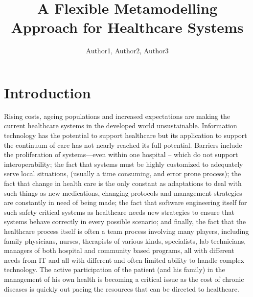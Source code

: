 \documentclass[a4paper]{llncs}
\begin{document}

\title{A Flexible Metamodelling Approach for Healthcare Systems} %


\author{Author1, Author2, Author3 }

\maketitle

\begin{abstract}


\end{abstract}


\section{Introduction}

Rising costs, ageing populations and increased expectations are making the current healthcare systems in the developed world unsustainable.  
Information technology has the potential to support healthcare but its application to support the continuum of care has not nearly reached its full potential.  
Barriers include the proliferation of systems—even within one hospital -- which do not support interoperability; the fact that systems must be highly 
customized to adequately serve local situations, (usually a time consuming, and error prone  process); the fact that change in health care is the only constant as 
adaptations to deal with such things as new medications, changing protocols  and management strategies are constantly in need of being made; the fact that software engineering 
itself for such safety critical systems as healthcare needs new strategies to ensure that systems behave correctly in every possible  scenario;  and finally, the fact that 
the healthcare process itself is often a team process involving many players, including family physicians, nurses, therapists of various kinds, specialists, lab technicians, 
managers of both hospital and  community based programs, all with different needs from IT and all with different and often limited ability to handle complex technology.  
The active participation of the patient (and his family) in the management of his own health is becoming a critical issue as the cost of chronic diseases is quickly out pacing 
the resources that can be directed to healthcare.
\end{document}
